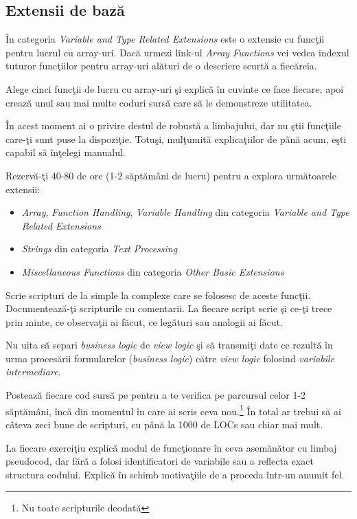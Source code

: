 \subsection{Extensii de bază}
În categoria \textit{Variable and Type Related Extensions}
este o extensie cu funcţii pentru lucrul cu array-uri.
Dacă urmezi link-ul \textit{Array Functions} vei vedea
indexul tuturor funcţiilor pentru array-uri alături de
o descriere scurtă a fiecăreia.

\begin{Exercise}[title={Înţelege manualul}]
Alege cinci funcţii de lucru cu array-uri şi
explică în cuvinte ce face fiecare, apoi crează
unul sau mai multe coduri sursă care să le demonstreze
utilitatea.
\end{Exercise}
\begin{Exercise}[difficulty=3,title={Explorează manualul}]
În acest moment ai o privire destul de robustă a
limbajului, dar nu ştii funcţiile care-ţi sunt
puse la dispoziţie. Totuşi, mulţumită explicaţiilor
de până acum, eşti capabil să înţelegi manualul.

Rezervă-ţi 40-80 de ore (1-2 săptămâni de lucru)
pentru a explora următoarele extensii:
\begin{itemize}
\item \textit{Array},
\textit{Function Handling}, \textit{Variable Handling} din categoria \textit{Variable and Type Related Extensions}
\item \textit{Strings} din categoria \textit{Text Processing}
\item \textit{Miscellaneous Functions} din categoria \textit{Other Basic Extensions}
\end{itemize}
Scrie scripturi de la simple la complexe care se folosesc
de aceste funcţii. Documentează-ţi scripturile cu comentarii.
La fiecare script scrie şi ce-ţi trece prin minte, ce observaţii
ai făcut, ce legături sau analogii ai făcut.

Nu uita să separi \textit{business logic} de \textit{view logic} şi să transmiţi date ce
rezultă în urma procesării formularelor (\textit{business logic}) către \textit{view logic}
folosind \textit{variabile intermediare}.

Postează fiecare cod sursă pe {\phpro} pentru a te verifica pe parcursul
celor 1-2 săptămâni, încă din momentul în care ai scris ceva nou.\footnote{Nu toate
scripturile deodată} În total ar trebui să ai câteva zeci bune de scripturi, cu
până la 1000 de LOCs sau chiar mai mult.

La fiecare exerciţiu explică modul de funcţionare \^in ceva asemănător cu
limbaj pseudocod, dar fără a folosi identificatori de variabile
sau a reflecta exact structura codului. Explică \^in schimb motivaţiile
de a proceda \^intr-un anumit fel.


\end{Exercise}
